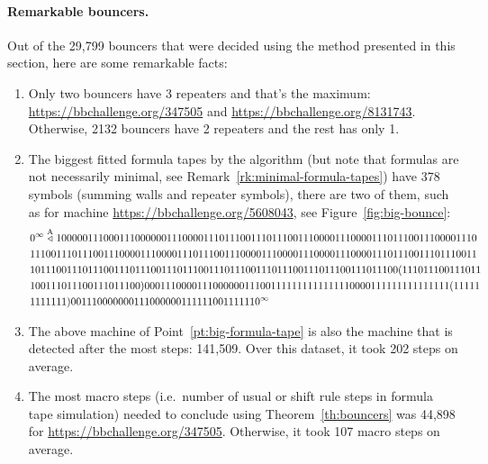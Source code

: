 \paragraph*{Remarkable bouncers.} Out of the 29,799 bouncers that were decided using the method presented in this section, here are some remarkable facts:
\begin{enumerate}
    \item Only two bouncers have 3 repeaters and that's the maximum: \url{https://bbchallenge.org/347505} and \url{https://bbchallenge.org/8131743}. Otherwise, 2132 bouncers have 2 repeaters and the rest has only 1.
    \item\label{pt:big-formula-tape} The biggest fitted formula tapes by the algorithm (but note that formulas are not necessarily minimal, see Remark~\ref{rk:minimal-formula-tapes}) have 378 symbols (summing walls and repeater symbols), there are two of them, such as for machine \url{https://bbchallenge.org/5608043}, see Figure~\ref{fig:big-bounce}:
          \begin{align*}
               & 0^\infty\stackrel{\text{A}}\triangleleft 1000001110001110000001110000111011100111011100111000011100 0011101110011100001110
              \\ &1110011101110011100001110000111011100111000011100001110000111000011101110011101110011\\ &1011100111011100111011100111011100111011100111011100111011100111011100 (111011100111011\\
               & 100111011100111011100)000111000011100000011100111111111111111
              0000111111111111111(11111                                                                                     \\ &1111111)                                                                            001110000000111000000111111001111110^\infty
          \end{align*}

    \item The above machine of Point~\ref{pt:big-formula-tape} is also the machine that is detected after the most steps: 141,509. Over this dataset, it took 202 steps on average.
    \item The most macro steps (i.e.\ number of usual or shift rule steps in formula tape simulation) needed to conclude using Theorem~\ref{th:bouncers} was 44,898 for \url{https://bbchallenge.org/347505}. Otherwise, it took 107 macro steps on average.

\end{enumerate}
